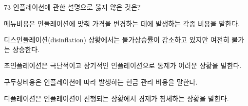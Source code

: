 \begin{question}{73}
인플레이션에 관한 설명으로 옳지 않은 것은?
\begin{choices}
  \item 메뉴비용은 인플레이션에 맞춰 가격을 변경하는 데에 발생하는 각종 비용을 말한다.
  \item 디스인플레이션(disinflation) 상황에서는 물가상승률이 감소하고 있지만 여전히 물가는 상승한다.
  \item 초인플레이션은 극단적이고 장기적인 인플레이션으로 통제가 어려운 상황을 말한다.
  \item 구두창비용은 인플레이션에 따라 발생하는 현금 관리 비용을 말한다.
  \item 디플레이션은 인플레이션이 진행되는 상황에서 경제가 침체하는 상황을 말한다.
\end{choices}
\end{question}
